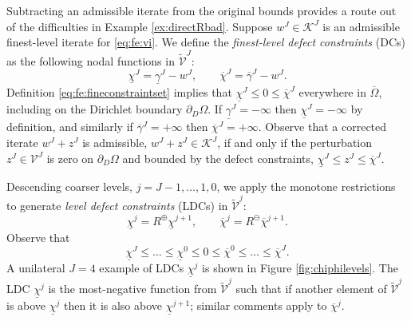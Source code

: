 \documentclass[letterpaper,final,12pt,reqno]{amsart}
\theoremstyle{cstyle}
\theoremstyle{cstyle*}
\theoremstyle{dstyle}
\numberwithin{equation}{section}
\numberwithin{figure}{section}
\numberwithin{table}{section}
\numberwithin{theorem}{section}
\newcommand{\cK}{\mathcal{K}}
\newcommand{\maxR}{R^{\bm{\oplus}}}
\newcommand{\minR}{R^{\bm{\ominus}}}
\begin{document}
Subtracting an admissible iterate from the original bounds provides a route out of the difficulties in Example \ref{ex:directRbad}.  Suppose $w^J \in \cK^J$ is an admissible finest-level iterate for \eqref{eq:fe:vi}.  We define the \emph{finest-level defect constraints} (DCs) \cite{GraeserKornhuber2009} as the following nodal functions in $\tilde{\mathcal{V}}^J$:
\begin{equation}
\underline{\chi}^J = \underline{\gamma}^J - w^J, \qquad \overline{\chi}^J = \overline{\gamma}^J - w^J. \label{eq:fe:defectconstraints}
\end{equation}
Definition \eqref{eq:fe:fineconstraintset} implies that $\underline{\chi}^J \le 0 \le \overline{\chi}^J$ everywhere in $\overline{\Omega}$, including on the Dirichlet boundary $\partial_D\Omega$.  If $\underline{\gamma}^J=-\infty$ then $\underline{\chi}^J=-\infty$ by definition, and similarly if $\overline{\gamma}^J=+\infty$ then $\overline{\chi}^J=+\infty$.  Observe that a corrected iterate $w^J + z^J$ is admissible, $w^J + z^J \in \cK^J$, if and only if the perturbation $z^J \in \mathcal{V}^J$ is zero on $\partial_D\Omega$ and bounded by the defect constraints, $\underline{\chi}^J \le z^J \le \overline{\chi}^J$.

Descending coarser levels, $j=J-1,\dots,1,0$, we apply the monotone restrictions to generate \emph{level defect constraints} (LDCs) in $\tilde{\mathcal{V}}^j$:
\begin{equation}
\underline{\chi}^{j} = \maxR \underline{\chi}^{j+1}, \qquad \overline{\chi}^{j} = \minR \overline{\chi}^{j+1}. \label{eq:fe:chilevels}
\end{equation}
Observe that
\begin{equation}
\underline{\chi}^{J} \le \dots \le \underline{\chi}^0 \le 0 \le \overline{\chi}^0 \le \dots \le \overline{\chi}^J. \label{eq:fe:chiordering}
\end{equation}
A unilateral $J=4$ example of LDCs $\underline{\chi}^j$ is shown in Figure \ref{fig:chiphilevels}.  The LDC $\underline{\chi}^j$ is the most-negative function from $\tilde{\mathcal{V}}^j$ such that if another element of $\tilde{\mathcal{V}}^j$ is above $\underline{\chi}^j$ then it is also above $\underline{\chi}^{j+1}$; similar comments apply to $\overline{\chi}^{j}$.
\end{document}
